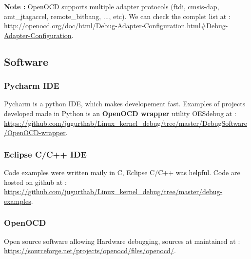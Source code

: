 \textbf{\color{orange}Note : } OpenOCD supports multiple adapter protocols (ftdi, cmsis-dap, amt\_jtagaccel, remote\_bitbang, ..., etc). We can check the complet list at : {\color{blue}\url{http://openocd.org/doc/html/Debug-Adapter-Configuration.html#Debug-Adapter-Configuration}}. 
\subsection{Software}


\subsubsection{Pycharm IDE}
Pycharm is a python IDE, which makes developement fast. Examples of projects developed made in Python is an \textbf{OpenOCD wrapper} utility \og OESdebug \fg at : {\color{blue}\url{https://github.com/jugurthab/Linux_kernel_debug/tree/master/DebugSoftware/OpenOCD-wrapper}}.
\subsubsection{Eclipse C/C++ IDE}
Code examples were written maily in C, Eclipse C/C++ was helpful. Code are hosted on github at : {\color{blue}\url{https://github.com/jugurthab/Linux_kernel_debug/tree/master/debug-examples}}.

\subsubsection{OpenOCD}
Open source software allowing Hardware debugging, sources at maintained at : {\color{blue}\url{https://sourceforge.net/projects/openocd/files/openocd/}}.
